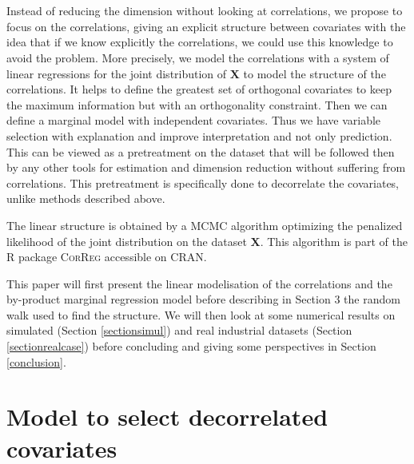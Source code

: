 \documentclass[11pt,a4paper]{article}
\begin{document}
	~\\	~\\

 Instead of reducing the dimension without looking at correlations,  we propose to focus on the correlations, giving an explicit structure between covariates with the idea that if we know explicitly the correlations, we could use this knowledge to avoid the problem. More precisely, we model the correlations with a system of linear regressions for the joint distribution of $\boldsymbol{X}$ to model the structure of the correlations. It helps to define the greatest set of orthogonal covariates to keep the maximum information but with an orthogonality constraint.
Then we can define a marginal model with independent covariates. Thus we have variable selection with explanation and improve interpretation and not only prediction.
 This can be viewed as a pretreatment on the dataset that will be followed then by any other tools for estimation and dimension reduction without suffering from correlations. This pretreatment is specifically done to decorrelate the covariates, unlike methods described above. 
 
  The linear structure is obtained by a MCMC algorithm optimizing the penalized likelihood of the joint distribution on the dataset $\boldsymbol{X}$. This algorithm is part of the R package \textsc{CorReg} accessible on \textsc{CRAN}. %
 
	
 	
 	This paper will first present the linear modelisation of the correlations and the by-product marginal regression model before describing in Section 3 the random walk used to find the structure.
 	We will then look at some numerical results on simulated (Section \ref{sectionsimul}) and real industrial datasets (Section \ref{sectionrealcase}) before concluding and giving some perspectives in Section \ref{conclusion}.
	
\section{Model to select decorrelated covariates}
\end{document}

